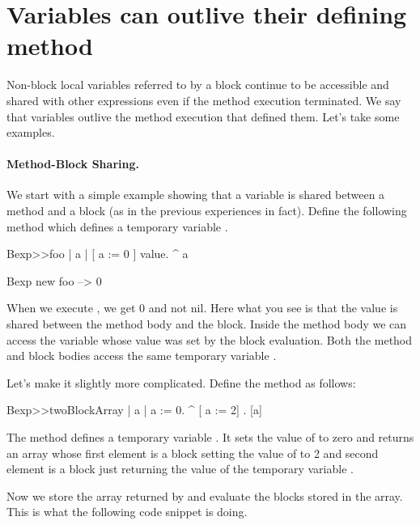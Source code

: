 \documentclass[a4paper,10pt,twoside]{book}
\begin{document}
\section{Variables can outlive their defining method}

Non-block local variables referred to by a block continue to be accessible and shared with other expressions even if the method execution terminated. We say that variables outlive the method execution that defined them.
Let's take some examples.

\paragraph{Method-Block Sharing.} We start with a simple example showing that a variable is shared between a method and a block (as in the previous experiences in fact). Define the following method  which defines a temporary variable .

\begin{code}{}
Bexp>>foo
	| a |
	[ a := 0 ] value.
	^ a
	
Bexp new foo
   --> 0	
\end{code}

When we execute , we get 0 and not nil.
Here what you see is that the value is shared between the method body and the block. Inside the method body we can access the variable whose value was set by the block evaluation.
Both the method  and block bodies access the same temporary variable .

Let's make it slightly more complicated. Define the method  as follows:

\begin{code}{}
Bexp>>twoBlockArray
	| a |
	a := 0.
	^ {[ a := 2] . [a]}
\end{code}

The method  defines a temporary variable . It sets the value of 
to zero and returns an array whose first element is a block setting the value of  to 2 and second element is a block just returning the value of the temporary variable .

Now we store the array returned by  and evaluate the blocks stored in the array. This is what the following code snippet is doing.
\end{document}
